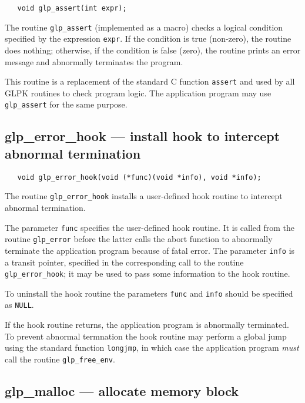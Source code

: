 \synopsis

\begin{verbatim}
   void glp_assert(int expr);
\end{verbatim}

\description

The routine \verb|glp_assert| (implemented as a macro) checks
a logical condition specified by the expression \verb|expr|. If the
condition is true (non-zero), the routine does nothing; otherwise, if
the condition is false (zero), the routine prints an error message and
abnormally terminates the program.

This routine is a replacement of the standard C function \verb|assert|
and used by all GLPK routines to check program logic. The application
program may use \verb|glp_assert| for the same purpose.

\subsection{glp\_error\_hook --- install hook to intercept abnormal
termination}

\synopsis

\begin{verbatim}
   void glp_error_hook(void (*func)(void *info), void *info);
\end{verbatim}

\description

The routine \verb|glp_error_hook| installs a user-defined hook routine
to intercept abnormal termination.

The parameter \verb|func| specifies the user-defined hook routine. It
is called from the routine \verb|glp_error| before the latter calls the
abort function to abnormally terminate the application program because
of fatal error. The parameter \verb|info| is a transit pointer,
specified in the corresponding call to the routine
\verb|glp_error_hook|; it may be used to pass some information to the
hook routine.

To uninstall the hook routine the parameters \verb|func| and \verb|info|
should be specified as \verb|NULL|.

If the hook routine returns, the application program is abnormally
terminated. To prevent abnormal termnation the hook routine may perform
a global jump using the standard function \verb|longjmp|, in which case
the application program {\it must} call the routine \verb|glp_free_env|.

\subsection{glp\_malloc --- allocate memory block}

